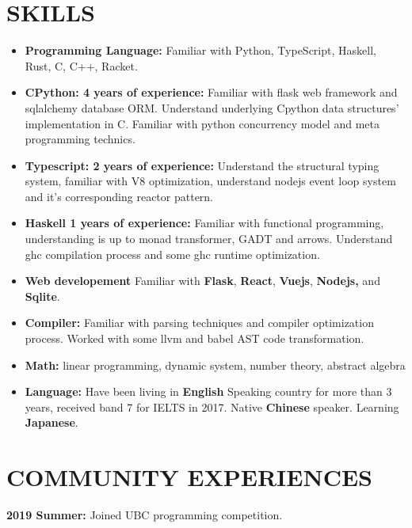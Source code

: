 \documentclass{res}
\begin{document}
\begin{resume}
\section{SKILLS}
    \begin{itemize}[leftmargin=-.2in]
        \setlength\itemsep{-1em}
        \item \textbf{Programming Language:} Familiar with Python, TypeScript, Haskell, Rust, C, C++, Racket.\\
        \item \textbf{CPython: 4 years of experience:} Familiar with flask web framework and sqlalchemy database ORM. Understand underlying Cpython data structures' implementation in C. Familiar with python concurrency model and meta programming technics. \\
        \item \textbf{Typescript: 2 years of experience:} Understand the structural typing system, familiar with V8 optimization, understand nodejs event loop system and it's corresponding reactor pattern. \\
        \item \textbf{Haskell 1 years of experience:} Familiar with functional programming, understanding is up to monad transformer, GADT and arrows. Understand ghc compilation process and some ghc runtime optimization. \\
        \item \textbf{Web developement} Familiar with \textbf{Flask}, \textbf{React}, \textbf{Vuejs}, \textbf{ Nodejs,} and \textbf{Sqlite}. \\
        \item \textbf{Compiler:} Familiar with parsing techniques and compiler optimization process. Worked with some llvm and babel AST code transformation. \\
        \item \textbf{Math:} linear programming, dynamic system, number theory, abstract algebra \\
        \item \textbf{Language:} Have been living in \textbf{English} Speaking country for more than 3 years, received band 7 for IELTS in 2017. Native \textbf{Chinese} speaker. Learning \textbf{Japanese}.
    \end{itemize}

\section{COMMUNITY EXPERIENCES}
    \textbf {2019 Summer:} Joined UBC programming competition.
\end{resume}
\end{document}
